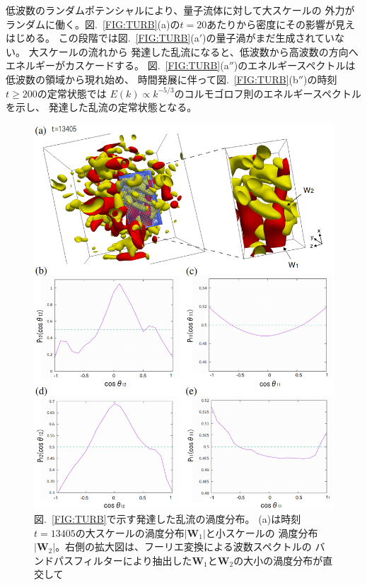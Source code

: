 \documentclass[12pt,a4paper]{jbook}
\begin{document}
			低波数のランダムポテンシャルにより、量子流体に対して大スケールの
			外力がランダムに働く。図.~\ref{FIG:TURB}(a)の$t=20$あたりから密度にその影響が見えはじめる。
            この段階では図.~\ref{FIG:TURB}(a$'$)の量子渦がまだ生成されていない。
			大スケールの流れから
            発達した乱流になると、低波数から高波数の方向へエネルギーがカスケードする。
			図.~\ref{FIG:TURB}(a$''$)のエネルギースペクトルは低波数の領域から現れ始め、
            時間発展に伴って図.~\ref{FIG:TURB}(b$''$)の時刻$t \geq 200$の定常状態では
            $E(k) \propto k^{-5/3}$のコルモゴロフ則のエネルギースペクトルを示し、
			発達した乱流の定常状態となる。
			\begin{figure}[H]
				\centering
				\includegraphics[width=15cm]{fig15.eps}
				\caption{
                    図.~\ref{FIG:TURB}で示す発達した乱流の渦度分布。
                    (a)は時刻$t=13405$の大スケールの渦度分布$|\bm{W}_1|$と小スケールの
                    渦度分布$|\bm{W}_2|$。右側の拡大図は、フーリエ変換による波数スペクトルの
                    バンドパスフィルターにより抽出した$\bm{W}_1$と$\bm{W}_2$の大小の渦度分布が直交して
}
\end{figure}
\end{document}
